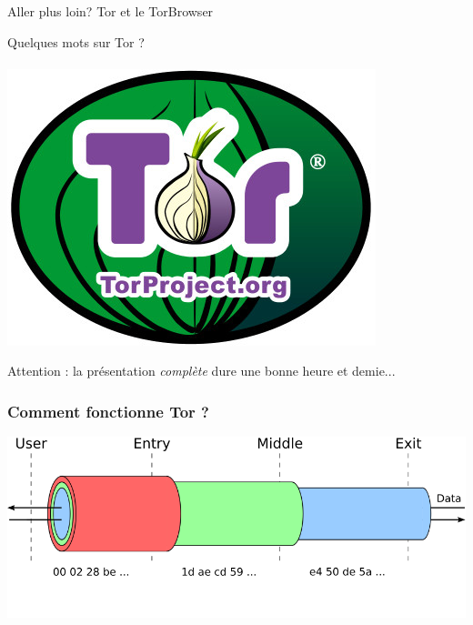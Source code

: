 \documentclass{beamer}
\begin{document}
\begin{frame}
\begin{center}
\Huge{Aller plus loin? Tor et le TorBrowser}
\end{center}
\end{frame}

\begin{frame}
\begin{center}
\Huge{Quelques mots sur Tor ? }
\\~\\ \includegraphics[scale=0.4]{./images/logo_tor.jpg}
\end{center}
\huge{Attention : la présentation \emph{complète} dure une bonne heure et demie...}
\end{frame}

\begin{frame}
\frametitle{Comment fonctionne Tor ?}
\begin{center}
\includegraphics[keepaspectratio,width=\textwidth, height=.8\textheight]{images/tor-keys1}
\end{center}
\end{frame}
\end{document}
